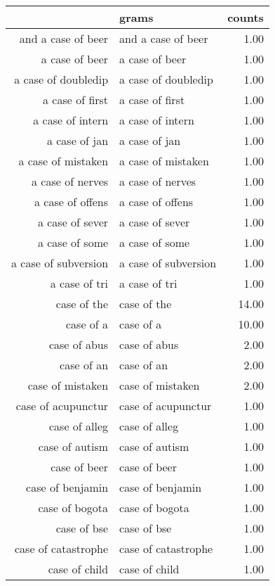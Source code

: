 \begin{table}[ht]
\centering
\begin{tabular}{rlr}
  \hline
 & grams & counts \\ 
  \hline
and a case of beer & and a case of beer & 1.00 \\ 
  a case of beer & a case of beer & 1.00 \\ 
  a case of doubledip & a case of doubledip & 1.00 \\ 
  a case of first & a case of first & 1.00 \\ 
  a case of intern & a case of intern & 1.00 \\ 
  a case of jan & a case of jan & 1.00 \\ 
  a case of mistaken & a case of mistaken & 1.00 \\ 
  a case of nerves & a case of nerves & 1.00 \\ 
  a case of offens & a case of offens & 1.00 \\ 
  a case of sever & a case of sever & 1.00 \\ 
  a case of some & a case of some & 1.00 \\ 
  a case of subversion & a case of subversion & 1.00 \\ 
  a case of tri & a case of tri & 1.00 \\ 
  case of the & case of the & 14.00 \\ 
  case of a & case of a & 10.00 \\ 
  case of abus & case of abus & 2.00 \\ 
  case of an & case of an & 2.00 \\ 
  case of mistaken & case of mistaken & 2.00 \\ 
  case of acupunctur & case of acupunctur & 1.00 \\ 
  case of alleg & case of alleg & 1.00 \\ 
  case of autism & case of autism & 1.00 \\ 
  case of beer & case of beer & 1.00 \\ 
  case of benjamin & case of benjamin & 1.00 \\ 
  case of bogota & case of bogota & 1.00 \\ 
  case of bse & case of bse & 1.00 \\ 
  case of catastrophe & case of catastrophe & 1.00 \\ 
  case of child & case of child & 1.00 \\ 

\end{tabular}
\end{table}
